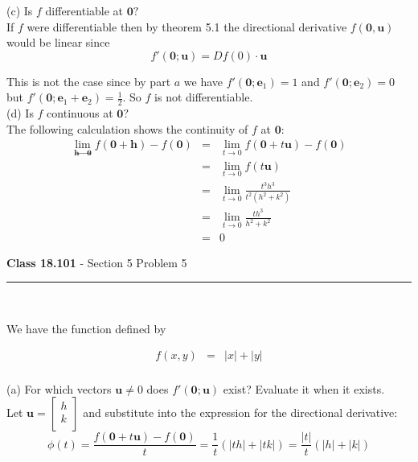 \documentclass[11pt,reqno]{article}
\begin{document}
\noindent (c) Is $f$ differentiable at $\textbf{0}?$\\

If $f$ were differentiable then by theorem 5.1 the directional derivative $f(\textbf{0},\textbf{u})$ would be linear since
\[ f'(\textbf{0}; \textbf{u}) = D f(0) \cdot \textbf{u}\]

This is not the case since by part $a$ we have $f'(\textbf{0}; \textbf{e}_1) = 1$ and $f'(\textbf{0}; \textbf{e}_2) = 0$ but $f'(\textbf{0}; \textbf{e}_1 + \textbf{e}_2) = \frac{1}{2}$. So $f$ is not differentiable.\\

\noindent (d) Is $f$ continuous at $\textbf{0}?$\\
 
\noindent The following calculation shows the continuity of $f$ at $\textbf{0}$:
 \begin{eqnarray*}
\lim_{\textbf{h} \to \textbf{0}} f(\textbf{0} + \textbf{h}) - f(\textbf{0}) &=& \lim_{t \to 0} f(\textbf{0} + t \textbf{u}) - f(\textbf{0})\\
&=& \lim_{t \to 0} f(t \textbf{u})\\
&=& \lim_{t \to 0} \frac{t^3 h^3}{t^2 (h^2 + k^2)} \\
&=& \lim_{t \to 0} \frac{t h^3}{h^2 + k^2} \\
&=& 0
\end{eqnarray*}

 
\vspace{15pt}
\begin{flushleft} 
\textbf{Class 18.101} - Section 5 Problem 5\\
\rule{500pt}{1pt}\\
\end{flushleft} 

\noindent We have the function defined by

\begin{eqnarray*} 
f(x,y) &=& |x| + |y| \\
\end{eqnarray*}

\noindent (a) For which vectors $\textbf{u} \neq 0$ does $f'(\textbf{0};\textbf{u})$ exist? Evaluate it when it exists.\\

\noindent Let $\textbf{u} = \left[ \begin{array}{c} h\\ k\\ \end{array} \right]$ and substitute into the expression for the directional derivative:
\[ \phi(t) = \frac{f(\textbf{0} + t \textbf{u}) - f(\textbf{0})}{t} = \frac{1}{t} (|t h| + |t k|) =  \frac{|t|}{t} (|h| + |k|) \]
\end{document}
